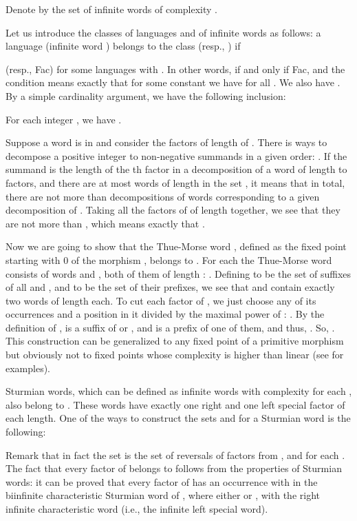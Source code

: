 \documentclass[runningheads,envcountsect,envcountsame]{llncs}
\begin{document}
Denote by  the set of infinite words of complexity .

Let us introduce the classes  of languages and  of infinite words as follows: a language  (infinite word ) belongs to the class  (resp., )
if

(resp., Fac) for some
languages  with .
In other words,  if and only if Fac, and the condition  means exactly
that for some constant  we have  for all .
We also have . 
By a simple cardinality argument, we have the following inclusion:

\begin{lemma}\label{l1}
 For each integer , we have .
\end{lemma}
 Suppose a word  is in 
and consider the factors of length  of . There is  ways to decompose a positive integer  to
 non-negative summands in a given order:
. If the summand  is the length of the th factor in a decomposition of a
word of length  to  factors, and there are at most 
words of length  in the set , it means that in total,
there are not more than  decompositions of words
corresponding to a given decomposition of . Taking all the
factors of  of length  together, we see that they are not
more than , which means exactly that . \hfill 


\begin{example} Now we are going to show that the Thue-Morse word , defined as the fixed point starting with 0 of the morphism , belongs to  . For each  the Thue-Morse word consists of words  and , both of them of length : . Defining  to be the set of suffixes of all  and , and  to be the set of their prefixes, we see that  and  contain exactly two words of length  each. To cut each factor  of , we just choose any of its occurrences and a position  in it divided by the maximal power  of : . By the definition of ,  is a suffix of  or , and  is a prefix of one of them, and thus, . So, . This construction can be generalized to any fixed point of a 
primitive morphism but obviously not to fixed points whose complexity is higher than linear (see \cite{pansiot} for examples).
\end{example}


\begin{example} Sturmian words, which can be defined as infinite words with complexity  for each , also belong to  . These words have exactly one right and one left special factor of each length. One of the ways to construct the sets  and  for a Sturmian word  is the following:

Remark that in fact the set  is the set of reversals of factors from , and  for each .
The fact that every factor of  belongs to  follows from the properties of Sturmian words: it can be proved that every factor  of  has an occurrence  with  in the biinfinite characteristic Sturmian word  of , where either  or  , with  the right infinite characteristic word (i.e., the infinite left special word). \end{example}
\end{document}
